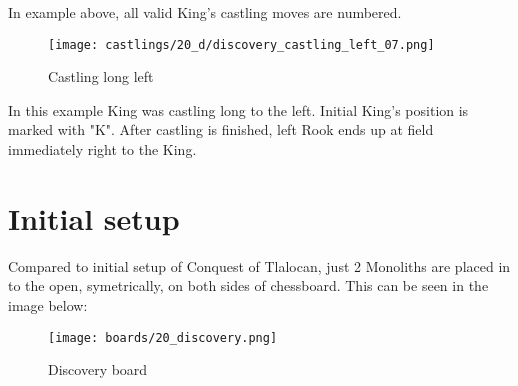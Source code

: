 In example above, all valid King's castling moves are numbered.

\noindent
\begin{figure}[!h]
\texttt{[image: castlings/20\_d/discovery\_castling\_left\_07.png]}
\caption{Castling long left}
\label{fig:discovery_castling_left_07}
\end{figure}

In this example King was castling long to the left. Initial King's position is marked with "K".
After castling is finished, left Rook ends up at field immediately right to the King.

\clearpage %

\section*{Initial setup}

Compared to initial setup of Conquest of Tlalocan, just 2 Monoliths are placed in to the open,
symetrically, on both sides of chessboard. This can be seen in the image below:

\noindent
\begin{figure}[h]
\texttt{[image: boards/20\_discovery.png]}
\caption{Discovery board}
\label{fig:20_discovery}
\end{figure}

\clearpage %
